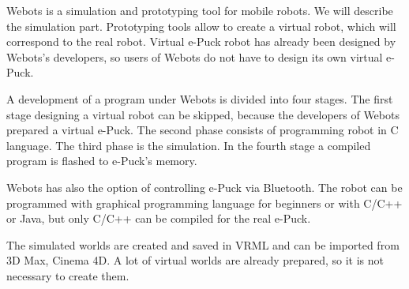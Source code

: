   Webots is a simulation and prototyping tool for mobile robots.
  We will describe the simulation part.  Prototyping tools allow to create a virtual robot,
  which will correspond to the real robot.
  Virtual e-Puck robot has already been designed
  by Webots's developers, so users of Webots do not have to design its own virtual e-Puck.
  
  A development of a program under Webots is divided into four stages. 
  The first stage designing a virtual robot can be skipped,
  because the developers of Webots prepared a virtual e-Puck.
  The second phase consists of programming robot in C language. 
  The third phase is the simulation. 
  In the fourth stage a compiled program is flashed to e-Puck's memory.
  
  Webots has also the option of controlling e-Puck via Bluetooth.
  The robot can be programmed with graphical programming language 
  for beginners or with C/C++ or Java,
  but only C/C++ can be compiled for the real e-Puck.

  The simulated worlds are created and saved in VRML and can be imported 
  from 3D Max, Cinema 4D.
  A lot of virtual worlds are already prepared, so it is not necessary to create them.
  

  \clearpage

